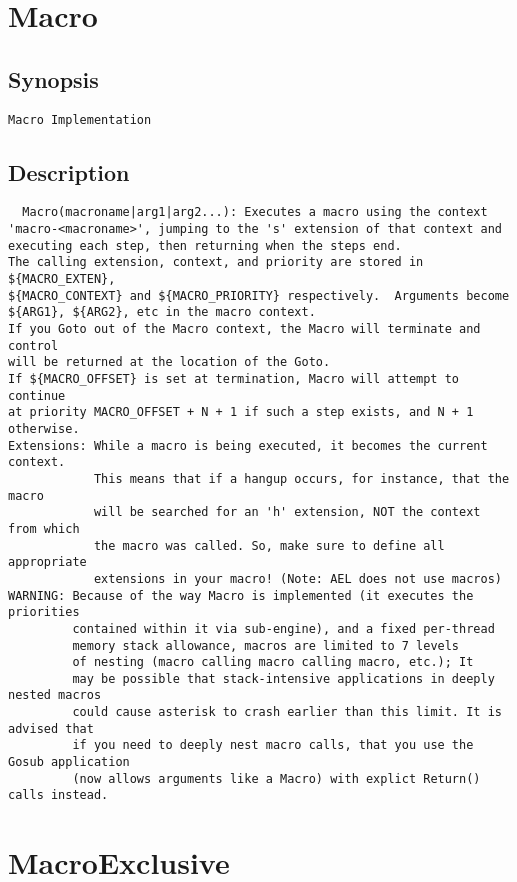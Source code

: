 \section{Macro}
\subsection{Synopsis}
\begin{verbatim}
Macro Implementation
\end{verbatim}
\subsection{Description}
\begin{verbatim}
  Macro(macroname|arg1|arg2...): Executes a macro using the context
'macro-<macroname>', jumping to the 's' extension of that context and
executing each step, then returning when the steps end. 
The calling extension, context, and priority are stored in ${MACRO_EXTEN}, 
${MACRO_CONTEXT} and ${MACRO_PRIORITY} respectively.  Arguments become
${ARG1}, ${ARG2}, etc in the macro context.
If you Goto out of the Macro context, the Macro will terminate and control
will be returned at the location of the Goto.
If ${MACRO_OFFSET} is set at termination, Macro will attempt to continue
at priority MACRO_OFFSET + N + 1 if such a step exists, and N + 1 otherwise.
Extensions: While a macro is being executed, it becomes the current context.
            This means that if a hangup occurs, for instance, that the macro
            will be searched for an 'h' extension, NOT the context from which
            the macro was called. So, make sure to define all appropriate
            extensions in your macro! (Note: AEL does not use macros)
WARNING: Because of the way Macro is implemented (it executes the priorities
         contained within it via sub-engine), and a fixed per-thread
         memory stack allowance, macros are limited to 7 levels
         of nesting (macro calling macro calling macro, etc.); It
         may be possible that stack-intensive applications in deeply nested macros
         could cause asterisk to crash earlier than this limit. It is advised that
         if you need to deeply nest macro calls, that you use the Gosub application
         (now allows arguments like a Macro) with explict Return() calls instead.

\end{verbatim}


\section{MacroExclusive}
